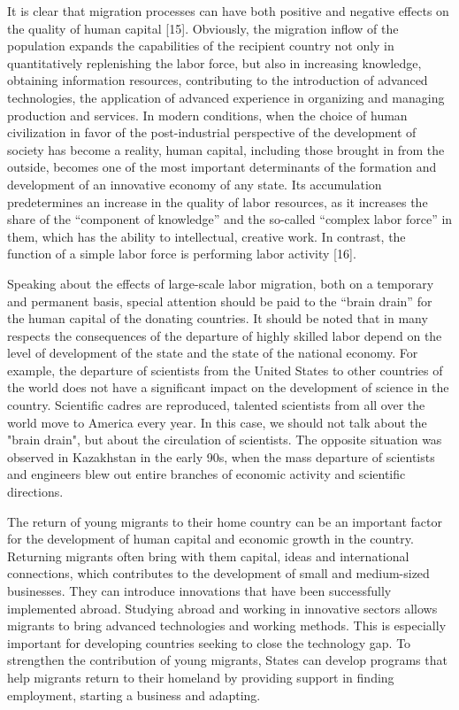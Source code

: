 {It is clear that migration processes can have both positive and negative
effects on the quality of human capital {[}15{]}. Obviously, the
migration inflow of the population expands the capabilities of the
recipient country not only in quantitatively replenishing the labor
force, but also in increasing knowledge, obtaining information
resources, contributing to the introduction of advanced technologies,
the application of advanced experience in organizing and managing
production and services. In modern conditions, when the choice of human
civilization in favor of the post-industrial perspective of the
development of society has become a reality, human capital, including
those brought in from the outside, becomes one of the most important
determinants of the formation and development of an innovative economy
of any state. Its accumulation predetermines an increase in the quality
of labor resources, as it increases the share of the ``component of
knowledge'' and the so-called ``complex labor force'' in them, which has
the ability to intellectual, creative work. In contrast, the function of
a simple labor force is performing labor activity {[}16{]}.

Speaking about the effects of large-scale labor migration, both on a
temporary and permanent basis, special attention should be paid to the
``brain drain'' for the human capital of the donating countries. It
should be noted that in many respects the consequences of the departure
of highly skilled labor depend on the level of development of the state
and the state of the national economy. For example, the departure of
scientists from the United States to other countries of the world does
not have a significant impact on the development of science in the
country. Scientific cadres are reproduced, talented scientists from all
over the world move to America every year. In this case, we should not
talk about the "brain drain", but about the circulation of scientists.
The opposite situation was observed in Kazakhstan in the early 90s, when
the mass departure of scientists and engineers blew out entire branches
of economic activity and scientific directions.

The return of young migrants to their home country can be an important
factor for the development of human capital and economic growth in the
country. Returning migrants often bring with them capital, ideas and
international connections, which contributes to the development of small
and medium-sized businesses. They can introduce innovations that have
been successfully implemented abroad. Studying abroad and working in
innovative sectors allows migrants to bring advanced technologies and
working methods. This is especially important for developing countries
seeking to close the technology gap. To strengthen the contribution of
young migrants, States can develop programs that help migrants return to
their homeland by providing support in finding employment, starting a
business and adapting.

}
